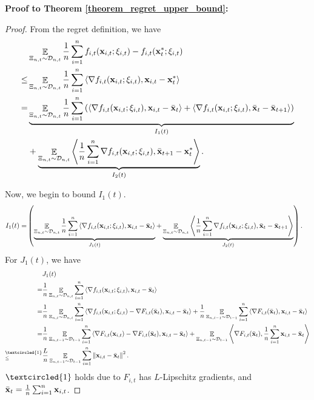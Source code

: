 \documentclass{article}
\begin{document}
\textbf{Proof to Theorem \ref{theorem_regret_upper_bound}:}
\begin{proof}
From the regret definition, we have
\begin{align}
\nonumber
& \mathop{\mathbb{E}}_{ \Xi_{n,t} \sim \mathcal{D}_{n,t} } \frac{1}{n}\sum_{i=1}^n f_{i,t}({\bf x}_{i,t};\xi_{i,t}) - f_{i,t}({\bf x}_t^\ast;\xi_{i,t}) \\ \nonumber
\le & \mathop{\mathbb{E}}_{ \Xi_{n,t} \sim \mathcal{D}_{n,t} } \frac{1}{n}\sum_{i=1}^n \left\langle \nabla f_{i,t}({\bf x}_{i,t};\xi_{i,t}),  {\bf x}_{i,t} - {\bf x}_t^\ast  \right\rangle \\ \nonumber
= & \underbrace{ \mathop{\mathbb{E}}_{ \Xi_{n,t} \sim \mathcal{D}_{n,t} } \frac{1}{n}\sum_{i=1}^n   \left( \left\langle\nabla  f_{i,t}({\bf x}_{i,t};\xi_{i,t}), {\bf x}_{i,t} - \bar{{\bf x}}_t  \right\rangle + \left\langle\nabla  f_{i,t}({\bf x}_{i,t};\xi_{i,t}), \bar{{\bf x}}_t - \bar{{\bf x}}_{t+1}  \right\rangle  \right) }_{I_1(t)} \\ \nonumber 
&+ \underbrace{ \mathop{\mathbb{E}}_{ \Xi_{n,t} \sim \mathcal{D}_{n,t} } \left\langle\frac{1}{n}\sum_{i=1}^n\nabla f_{i,t}({\bf x}_{i,t};\xi_{i,t}), \bar{{\bf x}}_{t+1} - {\bf x}_t^\ast  \right\rangle }_{I_2(t)}. \nonumber
\end{align}

Now, we begin to bound $I_1(t)$.
\begin{align}
\nonumber
I_1(t) = &    \left( \underbrace{ \mathop{\mathbb{E}}_{ \Xi_{n,t} \sim \mathcal{D}_{n,t} }\frac{1}{n}\sum_{i=1}^n\left\langle\nabla f_{i,t}({\bf x}_{i,t}; \xi_{i,t}), {\bf x}_{i,t} - \bar{{\bf x}}_t  \right\rangle }_{J_1(t)} +  \underbrace{ \mathop{\mathbb{E}}_{ \Xi_{n,t} \sim \mathcal{D}_{n,t} }\left\langle\frac{1}{n}\sum_{i=1}^n \nabla f_{i,t}({\bf x}_{i,t};\xi_{i,t}), \bar{{\bf x}}_t - \bar{{\bf x}}_{t+1}  \right\rangle}_{J_2(t)} \right).
\end{align} For $J_1(t)$, we have
\begin{align}
\nonumber
& J_1(t) \\ \nonumber 
= & \frac{1}{n}\EE_{ \Xi_{n,t} \sim \Dcal_{n,t} }\sum_{i=1}^n\lrangle{\nabla f_{i,t}(\x_{i,t}; \xi_{i,t}), \x_{i,t} - \bar{\x}_t } \\ \nonumber
= & \frac{1}{n}\EE_{ \Xi_{n,t} \sim \Dcal_{n,t} } \sum_{i=1}^n\lrangle{\nabla f_{i,t}(\x_{i,t}; \xi_{i,t}) - \nabla F_{i,t}(\bar{\x}_t), \x_{i,t} - \bar{\x}_t } + \frac{1}{n}\EE_{ \Xi_{n,t-1} \sim \Dcal_{t-1} }\sum_{i=1}^n\lrangle{\nabla F_{i,t}(\bar{\x}_t), \x_{i,t} - \bar{\x}_t } \\ \nonumber
= & \frac{1}{n}\EE_{ \Xi_{n,t-1} \sim \Dcal_{t-1} }\sum_{i=1}^n\lrangle{\nabla F_{i,t}(\x_{i,t}) - \nabla F_{i,t}(\bar{\x}_t), \x_{i,t} - \bar{\x}_t } + \EE_{ \Xi_{n,t-1} \sim \Dcal_{t-1} }\lrangle{\nabla F_{i,t}(\bar{\x}_t), \frac{1}{n}\sum_{i=1}^n\x_{i,t} - \bar{\x}_t } \\ \nonumber
\refabovecir{\le}{\textcircled{1}} & \frac{L}{n}\EE_{ \Xi_{n,t-1} \sim \Dcal_{t-1} }\sum_{i=1}^n \lrnorm{\x_{i,t} - \bar{\x}_t}^2. 
\end{align} $\textcircled{1}$ holds due to $F_{i,t}$ has $L$-Lipschitz gradients, and $\bar{{\bf x}}_t = \frac{1}{n}\sum_{i=1}^n {\bf x}_{i,t}$.


\end{proof}
\end{document}
